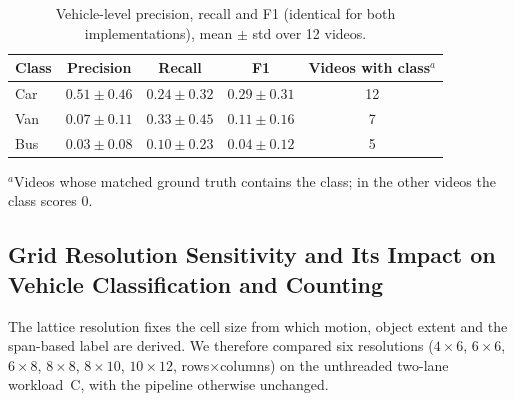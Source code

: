 \documentclass[conference]{IEEEtran}
\begin{document}
\begin{table}[t]
\centering
\caption{Vehicle-level precision, recall and F1 (identical for both
implementations), mean $\pm$ std over 12 videos.}
\label{tab:prf}
\scriptsize
\setlength{\tabcolsep}{4pt}
\begin{tabular}{lcccc}
\toprule
\textbf{Class} & \textbf{Precision} & \textbf{Recall} & \textbf{F1} & \textbf{Videos with class$^{a}$} \\
\midrule
Car & $0.51\pm0.46$ & $0.24\pm0.32$ & $0.29\pm0.31$ & 12 \\
Van & $0.07\pm0.11$ & $0.33\pm0.45$ & $0.11\pm0.16$ & 7 \\
Bus & $0.03\pm0.08$ & $0.10\pm0.23$ & $0.04\pm0.12$ & 5 \\
\bottomrule
\end{tabular}

\smallskip
\parbox{\columnwidth}{\scriptsize $^{a}$Videos whose matched ground truth
contains the class; in the other videos the class scores 0.}
\end{table}

\subsection{Grid Resolution Sensitivity and Its Impact on Vehicle Classification and Counting}
\label{sec:grid-sensitivity}
The lattice resolution fixes the cell size from which motion, object
extent and the span-based label are derived. We therefore compared six
resolutions ($4{\times}6$, $6{\times}6$, $6{\times}8$, $8{\times}8$,
$8{\times}10$, $10{\times}12$, rows$\times$columns) on the unthreaded
two-lane workload~C, with the pipeline otherwise unchanged.
\end{document}
